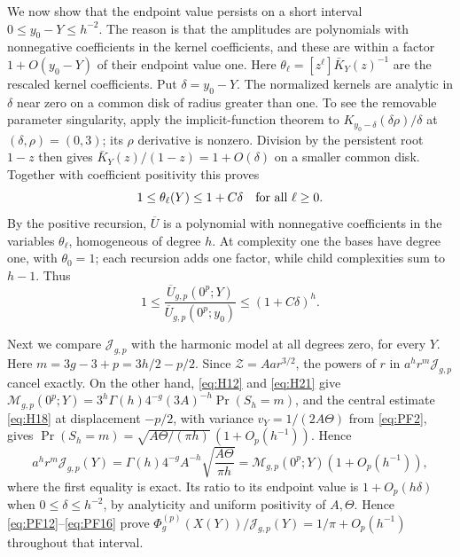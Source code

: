 We now show that the endpoint value persists on a short interval
$0\le y_0-Y\le h^{-2}$. The reason is that the amplitudes are polynomials
with nonnegative coefficients in the kernel coefficients, and these are
within a factor $1+O(y_0-Y)$ of their endpoint value one.
Here $\theta_\ell=[z^\ell]\bar K_Y(z)^{-1}$ are the rescaled kernel coefficients. Put $\delta=y_0-Y$. The normalized kernels are analytic in $\delta$
near zero on a common disk of radius greater than one. To see the
removable parameter singularity, apply the implicit-function theorem
to $K_{y_0-\delta}(\delta\rho)/\delta$ at $(\delta,\rho)=(0,3)$;
its $\rho$ derivative is nonzero. Division by the persistent root
$1-z$ then gives $\bar K_Y(z)/(1-z)=1+O(\delta)$ on a smaller common disk.
Together with coefficient positivity this proves
\begin{equation}
 1\le\theta_\ell(Y)\le1+C\delta\quad\hbox{for all }\ell\ge0.
 \label{eq:PF14}
\end{equation}
By the positive recursion, $\overline U$ is a polynomial with nonnegative
coefficients in the variables $\theta_\ell$, homogeneous of degree $h$. At complexity one the bases have degree one, with $\theta_0=1$;
each recursion adds one factor, while child complexities sum to $h-1$.
Thus
\begin{equation}
 1\le\frac{\overline U_{g,p}(0^p;Y)}
                {\overline U_{g,p}(0^p;y_0)}
 \le(1+C\delta)^h.
 \label{eq:PF15}
\end{equation}

Next we compare $\mathcal J_{g,p}$ with the harmonic model at all
degrees zero, for every $Y$. Here $m=3g-3+p=3h/2-p/2$. Since
$\mathcal Z=Aar^{3/2}$, the powers of $r$ in $a^hr^m\mathcal J_{g,p}$ cancel
exactly. On the other hand, \eqref{eq:H12} and \eqref{eq:H21} give
$\mathcal M_{g,p}(0^p;Y)=3^h\Gamma(h)4^{-g}(3A)^{-h}\Pr(S_h=m)$, and the
central estimate \eqref{eq:H18} at displacement $-p/2$, with variance
$v_Y=1/(2A\Theta)$ from \eqref{eq:PF2}, gives
$\Pr(S_h=m)=\sqrt{A\Theta/(\pi h)}\,(1+O_p(h^{-1}))$. Hence
\begin{equation}
 a^h r^m\mathcal J_{g,p}(Y)
 =\Gamma(h)4^{-g}A^{-h}\sqrt{\frac{A\Theta}{\pi h}}
 =\mathcal M_{g,p}(0^p;Y)(1+O_p(h^{-1})),
 \label{eq:PF16}
\end{equation}
where the first equality is exact.
Its ratio to its endpoint value is $1+O_p(h\delta)$ when
$0\le\delta\le h^{-2}$, by analyticity and uniform positivity of
$A,\Theta$. Hence \eqref{eq:PF12}--\eqref{eq:PF16} prove
$\Phi_g^{(p)}(X(Y))/\mathcal J_{g,p}(Y)=1/\pi+O_p(h^{-1})$
throughout that interval.

